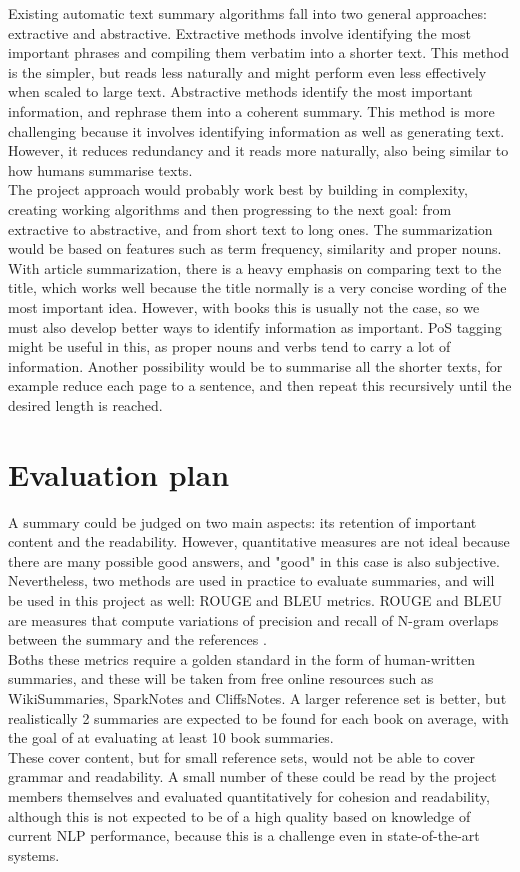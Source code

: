 Existing automatic text summary algorithms fall into two general approaches: extractive and abstractive. Extractive methods involve identifying the most important phrases and compiling them verbatim into a shorter text. This method is the simpler, but reads less naturally and might perform even less effectively when scaled to large text. Abstractive methods identify the most important information, and rephrase them into a coherent summary. This method is more challenging because it involves identifying information as well as generating text. However, it reduces redundancy and it reads more naturally, also being similar to how humans summarise texts. \cite{Gaikwad2016} \\
The project approach would probably work best by building in complexity, creating working algorithms and then progressing to the next goal: from extractive to abstractive, and from short text to long ones. The summarization would be based on features such as term frequency, similarity and proper nouns. With article summarization, there is a heavy emphasis on comparing text to the title, which works well because the title normally is a very concise wording of the most important idea. However, with books this is usually not the case, so we must also develop better ways to identify information as important. PoS tagging might be useful in this, as proper nouns and verbs tend to carry a lot of information. Another possibility would be to summarise all the shorter texts, for example reduce each page to a sentence, and then repeat this recursively until the desired length is reached.

\section{Evaluation plan}
A summary could be judged on two main aspects: its retention of important content and the readability. However, quantitative measures are not ideal because there are many possible good answers, and "good" in this case is also subjective. Nevertheless, two methods are used in practice to evaluate summaries, and will be used in this project as well: ROUGE and BLEU metrics. ROUGE and BLEU are measures that compute variations of precision and recall of N-gram overlaps between the summary and the references \cite{nenkova2006summarization} \cite{lin2004rouge}. \\
Boths these metrics require a golden standard in the form of human-written summaries, and these will be taken from free online resources such as WikiSummaries, SparkNotes and CliffsNotes. A larger reference set is better, but realistically 2 summaries are expected to be found for each book on average, with the goal of at evaluating at least 10 book summaries. \\
These cover content, but for small reference sets, would not be able to cover grammar and readability. A small number of these could be read by the project members themselves and evaluated quantitatively for cohesion and readability, although this is not expected to be of a high quality based on knowledge of current NLP performance, because this is a challenge even in state-of-the-art systems.

